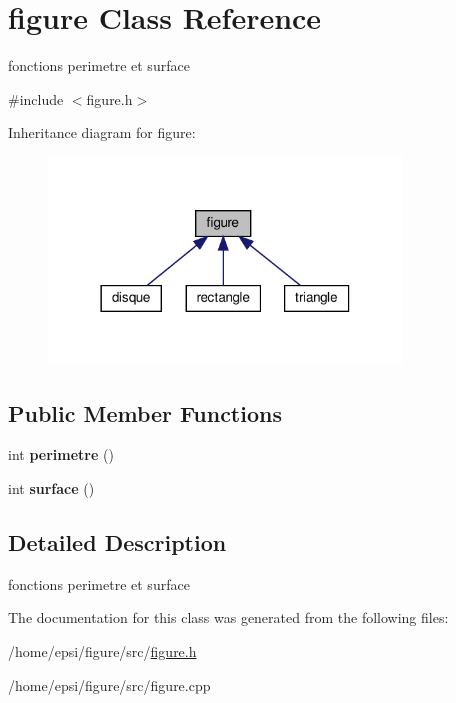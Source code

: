 \hypertarget{classfigure}{}\section{figure Class Reference}
\label{classfigure}


fonctions perimetre et surface  




{\ttfamily \#include $<$figure.\+h$>$}



Inheritance diagram for figure\+:
\nopagebreak
\begin{figure}[H]
\begin{center}
\leavevmode
\includegraphics[width=266pt]{classfigure__inherit__graph}
\end{center}
\end{figure}
\subsection*{Public Member Functions}
\begin{DoxyCompactItemize}
\item 
\mbox{\label{classfigure_a6ad51de31732e21f412ee7482e688ed0}} 
int {\bfseries perimetre} ()
\item 
\mbox{\label{classfigure_a4ab3ef3c25af52a19979f5824fb790da}} 
int {\bfseries surface} ()
\end{DoxyCompactItemize}


\subsection{Detailed Description}
fonctions perimetre et surface 

The documentation for this class was generated from the following files\+:\begin{DoxyCompactItemize}
\item 
/home/epsi/figure/src/\hyperlink{figure_8h}{figure.\+h}\item 
/home/epsi/figure/src/figure.\+cpp\end{DoxyCompactItemize}
